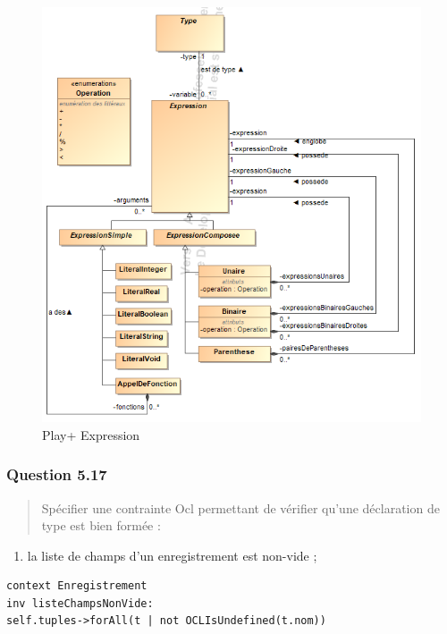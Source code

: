 \documentclass[]{article}
\providecommand{\tightlist}{%
  \setlength{\itemsep}{0pt}\setlength{\parskip}{0pt}}
\begin{document}
\begin{figure}
\centering
\includegraphics{./images_final/Play+Q16.png}
\caption{Play+ Expression}
\end{figure}

\hypertarget{question-5.17}{%
\subsubsection{Question 5.17}\label{question-5.17}}

\begin{quote}
Spécifier une contrainte Ocl permettant de vérifier qu'une déclaration
de type est bien formée :
\end{quote}

\begin{enumerate}
\def\labelenumi{\arabic{enumi})}
\tightlist
\item
  la liste de champs d'un enregistrement est non-vide ;
\end{enumerate}

\begin{verbatim}
context Enregistrement
inv listeChampsNonVide:
self.tuples->forAll(t | not OCLIsUndefined(t.nom))
\end{verbatim}
\end{document}
